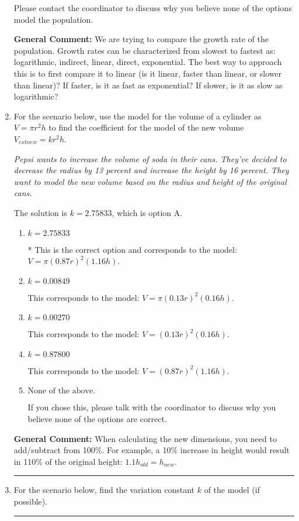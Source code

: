 \documentclass{extbook}[14pt]
\newcommand{\litem}[1]{\item #1

\rule{\textwidth}{0.4pt}}
\begin{document}
\begin{enumerate}
{\begin{enumerate}[label=\Alph*.]
Please contact the coordinator to discuss why you believe none of the options model the population.
\end{enumerate}

\textbf{General Comment:} We are trying to compare the growth rate of the population. Growth rates can be characterized from slowest to fastest as: logarithmic, indirect, linear, direct, exponential. The best way to approach this is to first compare it to linear (is it linear, faster than linear, or slower than linear)? If faster, is it as fast as exponential? If slower, is it as slow as logarithmic?
}
\litem{
For the scenario below, use the model for the volume of a cylinder as $V = \pi r^2 h$ to find the coefficient for the model of the new volume $V_{	ext{new}} = k r^2 h$.

\begin{center}
    \textit{ Pepsi wants to increase the volume of soda in their cans. They've decided to decrease the radius by 13 percent and increase the height by 16 percent. They want to model the new volume based on the radius and height of the original cans. }
\end{center}
The solution is \( k = 2.75833 \), which is option A.\begin{enumerate}[label=\Alph*.]
\item \( k = 2.75833 \)

* This is the correct option and corresponds to the model: $V = \pi (0.87 r)^2 (1.16 h)$.
\item \( k = 0.00849 \)

This corresponds to the model: $V = \pi (0.13 r)^2 (0.16 h)$.
\item \( k = 0.00270 \)

This corresponds to the model: $V = (0.13 r)^2 (0.16 h)$.
\item \( k = 0.87800 \)

This corresponds to the model: $V = (0.87 r)^2 (1.16 h)$.
\item \( \text{None of the above.} \)

If you chose this, please talk with the coordinator to discuss why you believe none of the options are correct.
\end{enumerate}

\textbf{General Comment:} When calculating the new dimensions, you need to add/subtract from 100\%. For example, a 10\% increase in height would result in 110\% of the original height: $1.1h_{old} = h_{new}$.
}
\litem{
For the scenario below, find the variation constant $k$ of the model (if possible).

}
\end{enumerate}
\end{document}
